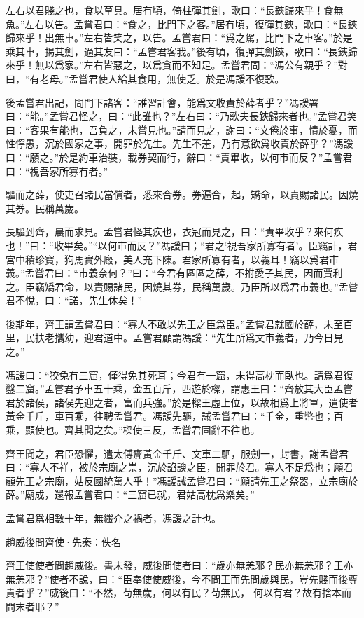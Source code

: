 \documentclass[12pt,a4paper]{ctexbook}
\begin{document}
左右以君賤之也，食以草具。居有頃，倚柱彈其劍，歌曰：“長鋏歸來乎！食無魚。”左右以告。孟嘗君曰：“食之，比門下之客。”居有頃，復彈其鋏，歌曰：“長鋏歸來乎！出無車。”左右皆笑之，以告。孟嘗君曰：“爲之駕，比門下之車客。”於是乘其車，揭其劍，過其友曰：“孟嘗君客我。”後有頃，復彈其劍鋏，歌曰：“長鋏歸來乎！無以爲家。”左右皆惡之，以爲貪而不知足。孟嘗君問：“馮公有親乎？”對曰，“有老母。”孟嘗君使人給其食用，無使乏。於是馮諼不復歌。\par
後孟嘗君出記，問門下諸客：“誰習計會，能爲文收責於薛者乎？”馮諼署曰：“能。”孟嘗君怪之，曰：“此誰也？”左右曰：“乃歌夫長鋏歸來者也。”孟嘗君笑曰：“客果有能也，吾負之，未嘗見也。”請而見之，謝曰：“文倦於事，憒於憂，而性懧愚，沉於國家之事，開罪於先生。先生不羞，乃有意欲爲收責於薛乎？”馮諼曰：“願之。”於是約車治裝，載券契而行，辭曰：“責畢收，以何市而反？”孟嘗君曰：“視吾家所寡有者。”\par
驅而之薛，使吏召諸民當償者，悉來合券。券遍合，起，矯命，以責賜諸民。因燒其券。民稱萬歲。\par
長驅到齊，晨而求見。孟嘗君怪其疾也，衣冠而見之，曰：“責畢收乎？來何疾也！”曰：“收畢矣。”“以何市而反？”馮諼曰；“君之‘視吾家所寡有者’。臣竊計，君宮中積珍寶，狗馬實外廄，美人充下陳。君家所寡有者，以義耳！竊以爲君市義。”孟嘗君曰：“市義奈何？”曰：“今君有區區之薛，不拊愛子其民，因而賈利之。臣竊矯君命，以責賜諸民，因燒其券，民稱萬歲。乃臣所以爲君市義也。”孟嘗君不悅，曰：“諾，先生休矣！”\par
後期年，齊王謂孟嘗君曰：“寡人不敢以先王之臣爲臣。”孟嘗君就國於薛，未至百里，民扶老攜幼，迎君道中。孟嘗君顧謂馮諼：“先生所爲文市義者，乃今日見之。”\par
馮諼曰：“狡兔有三窟，僅得免其死耳；今君有一窟，未得高枕而臥也。請爲君復鑿二窟。”孟嘗君予車五十乘，金五百斤，西遊於樑，謂惠王曰：“齊放其大臣孟嘗君於諸侯，諸侯先迎之者，富而兵強。”於是樑王虛上位，以故相爲上將軍，遣使者黃金千斤，車百乘，往聘孟嘗君。馮諼先驅，誡孟嘗君曰：“千金，重幣也；百乘，顯使也。齊其聞之矣。”樑使三反，孟嘗君固辭不往也。\par
齊王聞之，君臣恐懼，遣太傅齎黃金千斤、文車二駟，服劍一，封書，謝孟嘗君曰：“寡人不祥，被於宗廟之祟，沉於諂諛之臣，開罪於君。寡人不足爲也；願君顧先王之宗廟，姑反國統萬人乎！”馮諼誡孟嘗君曰：“願請先王之祭器，立宗廟於薛。”廟成，還報孟嘗君曰：“三窟已就，君姑高枕爲樂矣。”\par
孟嘗君爲相數十年，無纖介之禍者，馮諼之計也。\par
趙威後問齊使·先秦：佚名 \par
齊王使使者問趙威後。書未發，威後問使者曰：“歲亦無恙邪？民亦無恙邪？王亦無恙邪？”使者不說，曰：“臣奉使使威後，今不問王而先問歲與民，豈先賤而後尊貴者乎？”威後曰：“不然，苟無歲，何以有民？苟無民， 何以有君？故有捨本而問末者耶？”\par
\end{document}
